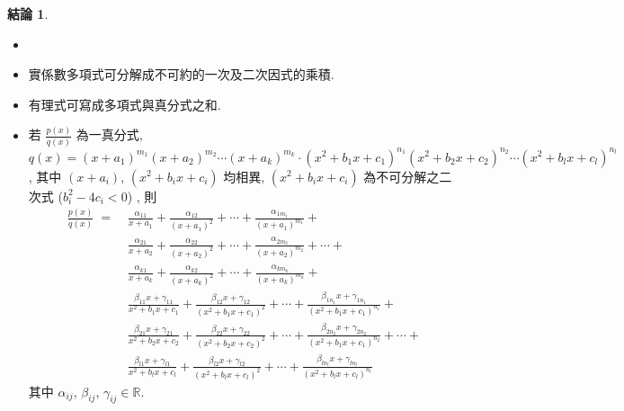 \documentclass[12pt]{extarticle}
\newcommand{\ds}{\displaystyle}
\DeclareMathOperator*{\degr}{deg}
\theoremstyle{definition}
\newtheorem*{fact}{結論}
\begin{document}
\begin{fact}
  \begin{itemize}\setlength{\itemsep}{0pt}
    \item[]
    \item 實係數多項式可分解成不可約的一次及二次因式的乘積. 
    \item 有理式可寫成多項式與真分式之和. 
    \item 若 $\ds\frac{p(x)}{q(x)}$ 為一真分式, $\ds q(x) = (x + a_1)^{m_1}(x + a_2)^{m_2}\cdots(x + a_k)^{m_k}\cdot(x^2 + b_1 x + c_1)^{n_1}(x^2 + b_2 x + c_2)^{n_2}\cdots(x^2 + b_l x + c_l)^{n_l}$, 其中 $(x + a_i)$, $(x^2 + b_i x + c_i)$ 均相異, $(x^2 + b_i x + c_i)$ 為不可分解之二次式 ($b_i^2 - 4 c_i < 0$) , 則
      \begin{align*}
        \frac{p(x)}{q(x)} \;=\; &\frac{\alpha_{11}}{x + a_1} + \frac{\alpha_{12}}{(x + a_1)^2} + \cdots + \frac{\alpha_{1m_1}}{(x + a_1)^{m_1}} + \\
        & \frac{\alpha_{21}}{x + a_2} + \frac{\alpha_{22}}{(x + a_2)^2} + \cdots + \frac{\alpha_{2{m_2}}}{(x + a_2)^{m_2}} + \cdots + \\
        & \frac{\alpha_{k1}}{x + a_k} + \frac{\alpha_{k2}}{(x + a_k)^2} + \cdots + \frac{\alpha_{k{m_k}}}{(x + a_k)^{m_k}} + \\
        & \frac{\beta_{11} x + \gamma_{11}}{x^2 + b_1 x + c_1} + \frac{\beta_{12} x + \gamma_{12}}{(x^2 + b_1 x + c_1)^2} + \cdots + \frac{\beta_{1n_1} x + \gamma_{1n_1}}{(x^2 + b_1 x + c_1)^{n_1}} + \\
        & \frac{\beta_{21} x + \gamma_{21}}{x^2 + b_2 x + c_2} + \frac{\beta_{22} x + \gamma_{22}}{(x^2 + b_2 x + c_2)^2} + \cdots + \frac{\beta_{2n_2} x + \gamma_{2n_2}}{(x^2 + b_1 x + c_1)^{n_2}} + \cdots + \\
        & \frac{\beta_{l1} x + \gamma_{l1}}{x^2 + b_l x + c_l} + \frac{\beta_{l2} x + \gamma_{l2}}{(x^2 + b_l x + c_l)^2} + \cdots + \frac{\beta_{ln_l} x + \gamma_{ln_l}}{(x^2 + b_l x + c_l)^{n_l}}
      \end{align*}
      其中 $\ds\alpha_{ij}$, $\ds\beta_{ij}$, $\ds\gamma_{ij}\in\mathbb{R}$. 

\end{itemize}
\end{fact}
\end{document}
